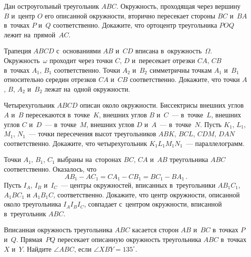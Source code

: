 \begin{problems}
\item
Дан остроугольный треугольник $ABC$.
Окружность, проходящая через вершину~$B$ и~центр $O$ его описанной окружности,
вторично пересекает стороны $BC$ и~$BA$ в~точках $P$ и~$Q$ соответственно.
Докажите, что ортоцентр треугольника $POQ$ лежит на~прямой~$AC$.

\item
Трапеция $ABCD$ с~основаниями $AB$ и~$CD$ вписана в~окружность~$\Omega$.
Окружность~$\omega$ проходит через точки $C$, $D$ и~пересекает
отрезки $CA$, $CB$ в~точках $A_1$, $B_1$ соответственно.
Точки $A_2$ и~$B_2$ симметричны точкам $A_1$ и~$B_1$ относительно середин
отрезков $CA$ и~$CB$ соответственно.
Докажите, что точки $A$, $B$, $A_2$ и~$B_2$ лежат на~одной окружности.

\item
Четырехугольник $ABCD$ описан около окружности.
Биссектрисы внешних углов $A$ и~$B$ пересекаются в~точке~$K$,
внешних углов $B$ и~$C$~--- в~точке~$L$, внешних углов $C$ и~$D$~---
в~точке~$M$, внешних углов $D$ и~$A$~--- в~точке~$N$.
Пусть $K_1$, $L_1$, $M_1$, $N_1$~--- точки пересечения высот
треугольников $ABK$, $BCL$, $CDM$, $DAN$ соответственно.
Докажите, что четырехугольник $K_1 L_1 M_1 N_1$~--- параллелограмм.

\item
Точки $A_1$, $B_1$, $C_1$ выбраны на~сторонах $BC$, $CA$ и~$AB$ треугольника
$ABC$ соответственно.
Оказалось, что
\[
    A B_1 - A C_1 = C A_1 - C B_1 = B C_1 - B A_1
\, . \]
Пусть $I_{A}$, $I_{B}$ и~$I_{C}$~--- центры окружностей, вписанных
в~треугольники $A B_1 C_1$, $A_1 B C_1$ и $A_1 B_1 C$, соответственно.
Докажите, что центр окружности, описанной около треугольника $I_A I_B I_C$,
совпадает с~центром окружности, вписанной в~треугольник $ABC$.

\item
Вписанная окружность треугольника $ABC$ касается сторон $AB$ и~$BC$
в~точках $P$ и~$Q$.
Прямая~$PQ$ пересекает описанную окружность треугольника $ABC$
в~точках $X$ и~$Y$.
Найдите $\angle ABC$, если $\angle XBY = 135^{\circ}$.

\end{problems}

